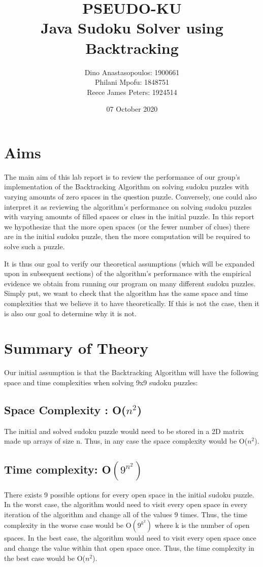 \documentclass{article}
\author{
  Dino Anastasopoulos: 1900661 \\
  Philani Mpofu: 1848751\\
  Reece James Peters: 1924514
}
\title{
  PSEUDO-KU\\
  Java Sudoku Solver using Backtracking
}
\date{07 October 2020}
\begin{document}
    \begin{titlepage}
        \maketitle{}
    \end{titlepage}
    
    \tableofcontents

    \pagebreak 
    \section{Aims}
    The main aim of this lab report is to review the performance of our group’s implementation of the Backtracking Algorithm on solving sudoku puzzles with varying amounts of zero spaces in the question puzzle. Conversely, one could also interpret it as reviewing the algorithm’s performance on solving sudoku puzzles with varying amounts of filled spaces or clues in the initial puzzle. In this report we hypothesize that the more open spaces (or the fewer number of clues) there are in the initial sudoku puzzle, then the more computation will be required to solve such a puzzle. 


    It is thus our goal to verify our theoretical assumptions (which will be expanded upon in subsequent sections) of the algorithm’s performance with the empirical evidence we obtain from running our program on many different sudoku puzzles. Simply put, we want to check that the algorithm has the same space and time complexities that we believe it to have theoretically. If this is not the case, then it is also our goal to determine why it is not. 


    \section{Summary of Theory}
    Our initial assumption is that the Backtracking Algorithm will have the following space and time complexities when solving 9x9 sudoku puzzles:


    \subsection{Space Complexity : O($n^2$)}
    The initial and solved sudoku puzzle would need to be stored in a 2D matrix made up arrays of size n. Thus, in any case the space complexity would be O($n^2$).\cite{GeeksforGeeks}


    \subsection{Time complexity: O$(9^{n^2})$} 
    There exists 9 possible options for every open space in the initial sudoku puzzle. In the worst case, the algorithm would need to visit every open space in every iteration of the algorithm and change all of the values 9 times. Thus, the time complexity in the worse case would be O$(9^{k^2})$ where k is the number of open spaces. In the best case, the algorithm would need to visit every open space once and change the value within that open space once. Thus, the time complexity in the best case would be O($n^2$). \cite{GeeksforGeeks}
\end{document}
